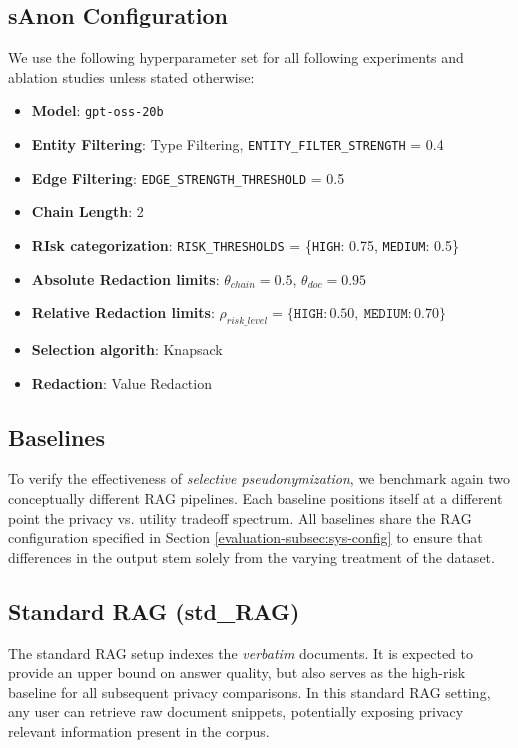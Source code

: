 \subsection{sAnon Configuration}\label{evaluation-subsec:sanon-config}
We use the following hyperparameter set for all following experiments and ablation studies unless stated otherwise:
\begin{tcolorbox}[title={sAnon Configuration}]
  \small
  \begin{itemize}
    \item \textbf{Model}: \texttt{gpt-oss-20b}
    \item \textbf{Entity Filtering}: Type Filtering, \texttt{ENTITY\_FILTER\_STRENGTH} = 0.4
    \item \textbf{Edge Filtering}: \texttt{EDGE\_STRENGTH\_THRESHOLD} = 0.5
    \item \textbf{Chain Length}: 2
    \item \textbf{RIsk categorization}: \texttt{RISK\_THRESHOLDS} = \{\texttt{HIGH}: 0.75, \texttt{MEDIUM}: 0.5\}
    \item \textbf{Absolute Redaction limits}: $\theta_{chain} = 0.5$, $\theta_{doc} = 0.95$ 
    \item \textbf{Relative Redaction limits}: $\rho_{risk\_level} = \{\texttt{HIGH}:0.50,\ \texttt{MEDIUM}:0.70\}$
    \item \textbf{Selection algorith}: Knapsack
    \item \textbf{Redaction}: Value Redaction
\end{itemize}
\end{tcolorbox}


\subsection{Baselines}\label{evaluation-subsec:baselines}
To verify the effectiveness of \textit{selective pseudonymization}, we benchmark again two conceptually different \ac{RAG} pipelines. Each baseline positions itself at a different point the privacy vs. utility tradeoff spectrum. All baselines share the \ac{RAG} configuration specified in Section \ref{evaluation-subsec:sys-config} to ensure that differences in the output stem solely from the varying treatment of the dataset.

\subsection*{Standard \ac{RAG} (std\_RAG)}
The standard \ac{RAG} setup indexes the \textit{verbatim} documents. It is expected to provide an upper bound on answer quality, but also serves as the high-risk baseline for all subsequent privacy comparisons. In this standard \ac{RAG} setting, any user can retrieve raw document snippets, potentially exposing privacy relevant information present in the corpus. 


